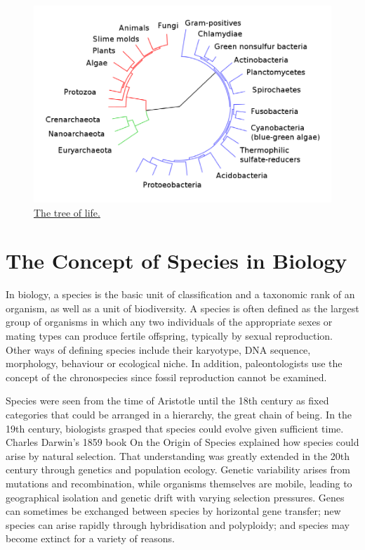 \begin{figure}

{\centering \includegraphics[width=0.7\linewidth]{./figures/systematics/tree_of_life} 

}

\caption{\href{https://commons.wikimedia.org/wiki/File:CollapsedtreeLabels-simplified.svg}{The tree of life.}}\label{fig:tree}
\end{figure}

\hypertarget{the-concept-of-species-in-biology}{%
\section{The Concept of Species in Biology}\label{the-concept-of-species-in-biology}}

In biology, a species is the basic unit of classification and a taxonomic rank of an organism, as well as a unit of biodiversity. A species is often defined as the largest group of organisms in which any two individuals of the appropriate sexes or mating types can produce fertile offspring, typically by sexual reproduction. Other ways of defining species include their karyotype, DNA sequence, morphology, behaviour or ecological niche. In addition, paleontologists use the concept of the chronospecies since fossil reproduction cannot be examined.

Species were seen from the time of Aristotle until the 18th century as fixed categories that could be arranged in a hierarchy, the great chain of being. In the 19th century, biologists grasped that species could evolve given sufficient time. Charles Darwin's 1859 book On the Origin of Species explained how species could arise by natural selection. That understanding was greatly extended in the 20th century through genetics and population ecology. Genetic variability arises from mutations and recombination, while organisms themselves are mobile, leading to geographical isolation and genetic drift with varying selection pressures. Genes can sometimes be exchanged between species by horizontal gene transfer; new species can arise rapidly through hybridisation and polyploidy; and species may become extinct for a variety of reasons.

